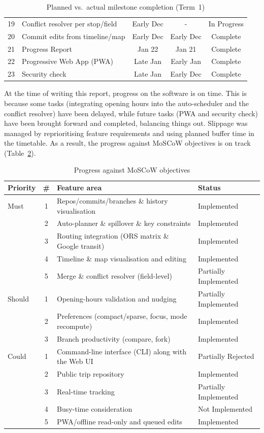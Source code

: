 \begin{table}[H]
\begin{tabularx}{\textwidth}{c X c c c}
19 & Conflict resolver per stop/field & Early Dec & - & In Progress\\
20 & Commit edits from timeline/map & Early Dec & Early Dec & Complete\\
21 & Progress Report & Jan 22 & Jan 21 & Complete\\
22 & Progressive Web App (PWA) & Late Jan & Early Jan & Complete\\
23 & Security check & Late Jan & Early Dec & Complete \\
\bottomrule
\end{tabularx}
\caption{Planned vs.\ actual milestone completion (Term~1)}
\label{tab:milestone-comparison}
\end{table}

At the time of writing this report, progress on the software is on time. This is because some tasks (integrating opening hours into the auto-scheduler and the conflict resolver) have been delayed, while future tasks (PWA and security check) have been brought forward and completed, balancing things out. Slippage was managed by reprioritising feature requirements and using planned buffer time in the timetable. As a result, the progress against MoSCoW objectives is on track (Table~\ref{tab:moscow-progress}).

\begin{table}[H]
\centering
\begin{tabularx}{\textwidth}{p{} c X p{}}
\toprule
\textbf{Priority} & \textbf{\#} & \textbf{Feature area} & \textbf{Status}\\
\midrule
Must & 1 & Repos/commits/branches \& history visualisation & Implemented\\
 & 2 & Auto-planner \& spillover \& key constraints & Implemented\\
 & 3 & Routing integration (ORS matrix \& Google transit) & Implemented\\
 & 4 & Timeline \& map visualisation and editing & Implemented\\
 & 5 & Merge \& conflict resolver (field-level) & Partially Implemented\\
\midrule
Should & 1 & Opening-hours validation and nudging & Partially Implemented\\
 & 2 & Preferences (compact/sparse, focus, mode recompute) & Implemented\\
 & 3 & Branch productivity (compare, fork) & Implemented\\
\midrule
Could & 1 & Command-line interface (CLI) along with the Web UI & Partially Rejected\\
 & 2 & Public trip repository & Implemented\\
 & 3 & Real-time tracking & Partially Implemented\\
 & 4 & Busy-time consideration & Not Implemented\\
 & 5 & PWA/offline read-only and queued edits & Implemented\\
\bottomrule
\end{tabularx}
\caption{Progress against MoSCoW objectives}
\label{tab:moscow-progress}
\end{table}
